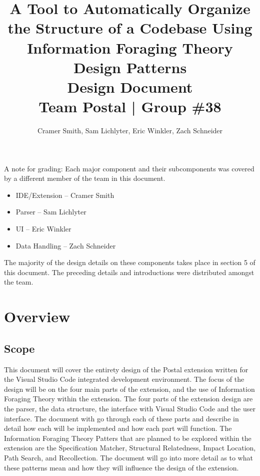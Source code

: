 \documentclass[letterpaper,10pt,titlepage,draftclsnofoot,onecolumn,onesided] {IEEEtran}
\def\doctitle{A Tool to Automatically Organize the Structure of a Codebase Using Information Foraging Theory Design Patterns}
\def\doctype{Design Document}
\def\team{Team Postal | Group \#38}
\begin{document}
\title{\Huge{\bfseries{\textsf{\doctitle}}}\\\textsf{\Large{\doctype}}\\\textsf{\large{\team}}}
\author{Cramer Smith, Sam Lichlyter, Eric Winkler, Zach Schneider}

\maketitle
\vfill
\vfill

\pagebreak

\tableofcontents

\pagebreak

A note for grading: Each major component and their subcomponents was covered by a different member of the team in this document. 
\begin{itemize}
\item IDE/Extension -- Cramer Smith
\item Parser -- Sam Lichlyter
\item UI -- Eric Winkler
\item Data Handling -- Zach Schneider
\end{itemize}
The majority of the design details on these components takes place in section 5 of this document. The preceding details and introductions were distributed amongst the team.

\pagebreak

\section{Overview}

\subsection{Scope}
This document will cover the entirety design of the Postal extension written for the Visual Studio Code integrated development environment. 
The focus of the design will be on the four main parts of the extension, and the use of Information Foraging Theory within the extension.
The four parts of the extension design are the parser, the data structure, the interface with Visual Studio Code and the user interface.
The document with go through each of these parts and describe in detail how each will be implemented and how each part will function.
The Information Foraging Theory Patters that are planned to be explored within the extension are the Specification Matcher, Structural Relatedness, Impact Location, Path Search, and Recollection.
The document will go into more detail as to what these patterns mean and how they will influence the design of the extension.
\end{document}
